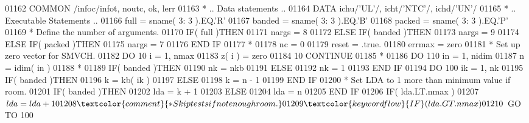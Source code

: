 \begin{DoxyCode}
01162       \textcolor{keyword}{COMMON}             /infoc/infot, noutc, ok, lerr
01163 \textcolor{comment}{*     .. Data statements ..}
01164       \textcolor{keyword}{DATA}               ichu/\textcolor{stringliteral}{'UL'}/, icht/\textcolor{stringliteral}{'NTC'}/, ichd/\textcolor{stringliteral}{'UN'}/
01165 \textcolor{comment}{*     .. Executable Statements ..}
01166       full = sname( 3: 3 ).EQ.\textcolor{stringliteral}{'R'}
01167       banded = sname( 3: 3 ).EQ.\textcolor{stringliteral}{'B'}
01168       packed = sname( 3: 3 ).EQ.\textcolor{stringliteral}{'P'}
01169 \textcolor{comment}{*     Define the number of arguments.}
01170       \textcolor{keywordflow}{IF}( full )\textcolor{keywordflow}{THEN}
01171          nargs = 8
01172       \textcolor{keywordflow}{ELSE} \textcolor{keywordflow}{IF}( banded )\textcolor{keywordflow}{THEN}
01173          nargs = 9
01174       \textcolor{keywordflow}{ELSE} \textcolor{keywordflow}{IF}( packed )\textcolor{keywordflow}{THEN}
01175          nargs = 7
01176 \textcolor{keywordflow}{      END IF}
01177 \textcolor{comment}{*}
01178       nc = 0
01179       reset = .true.
01180       errmax = zero
01181 \textcolor{comment}{*     Set up zero vector for SMVCH.}
01182       \textcolor{keywordflow}{DO} 10 i = 1, nmax
01183          z( i ) = zero
01184    10 \textcolor{keywordflow}{CONTINUE}
01185 \textcolor{comment}{*}
01186       \textcolor{keywordflow}{DO} 110 in = 1, nidim
01187          n = idim( in )
01188 \textcolor{comment}{*}
01189          \textcolor{keywordflow}{IF}( banded )\textcolor{keywordflow}{THEN}
01190             nk = nkb
01191          \textcolor{keywordflow}{ELSE}
01192             nk = 1
01193 \textcolor{keywordflow}{         END IF}
01194          \textcolor{keywordflow}{DO} 100 ik = 1, nk
01195             \textcolor{keywordflow}{IF}( banded )\textcolor{keywordflow}{THEN}
01196                k = kb( ik )
01197             \textcolor{keywordflow}{ELSE}
01198                k = n - 1
01199 \textcolor{keywordflow}{            END IF}
01200 \textcolor{comment}{*           Set LDA to 1 more than minimum value if room.}
01201             \textcolor{keywordflow}{IF}( banded )\textcolor{keywordflow}{THEN}
01202                lda = k + 1
01203             \textcolor{keywordflow}{ELSE}
01204                lda = n
01205 \textcolor{keywordflow}{            END IF}
01206             \textcolor{keywordflow}{IF}( lda.LT.nmax )
01207      $         lda = lda + 1
01208 \textcolor{comment}{*           Skip tests if not enough room.}
01209             \textcolor{keywordflow}{IF}( lda.GT.nmax )
01210      $         \textcolor{keywordflow}{GO TO} 100

\end{DoxyCode}
